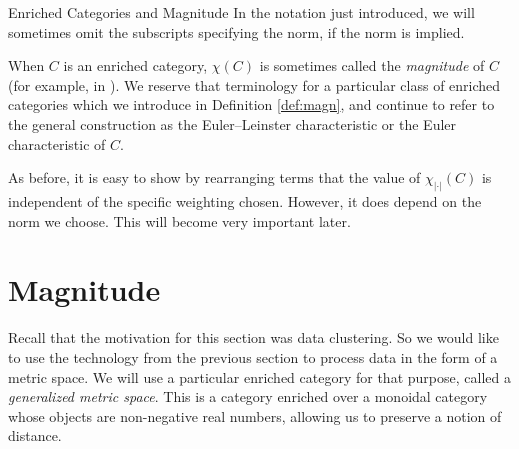 \documentclass[12pt]{pom_thesis}
\begin{document}
\begin{chapter}{Enriched Categories and Magnitude}
In the notation just introduced, we will sometimes omit the subscripts specifying the norm, if the norm is implied.
\begin{rmk}
When $C$ is an enriched category, $\chi(C)$ is sometimes called the \emph{magnitude} of $C$ (for example, in \cite{Lein4}). We reserve that terminology for a particular class of enriched categories which we introduce in Definition \ref{def:magn}, and continue to refer to the general construction as the Euler--Leinster characteristic or the Euler characteristic of $C$.
\end{rmk}
\begin{rmk}
As before, it is easy to show by rearranging terms that the value of $\chi_{|\cdot|}(C)$ is independent of the specific weighting chosen. However, it does depend on the norm we choose. This will become very important later.
\end{rmk}

\section{Magnitude}
Recall that the motivation for this section was data clustering. So we would like to use the technology from the previous section to process data in the form of a metric space. We will use a particular enriched category for that purpose, called a \emph{generalized metric space}. This is a category enriched over a monoidal category whose objects are non-negative real numbers, allowing us to preserve a notion of distance.  


\end{chapter}
\end{document}
